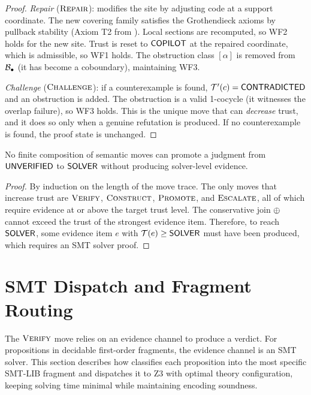 \begin{proof}
\emph{Repair} ($\textsc{Repair}$): modifies the site by adjusting code at
a support coordinate.  The new covering family satisfies the
Grothendieck axioms by pullback stability (Axiom T2 from
).  Local sections are recomputed, so WF2 holds
for the new site.  Trust is reset to $\mathsf{COPILOT}$ at the repaired
coordinate, which is admissible, so WF1 holds.  The obstruction
class $[\alpha]$ is removed from $\mathcal{B}_\bullet$ (it has become
a coboundary), maintaining WF3.

\emph{Challenge} ($\textsc{Challenge}$): if a counterexample is found,
$\mathcal{T}'(c) = \mathsf{CONTRADICTED}$ and an obstruction is added.  The
obstruction is a valid 1-cocycle (it witnesses the overlap
failure), so WF3 holds.  This is the unique move that can
\emph{decrease} trust, and it does so only when a genuine
refutation is produced.  If no counterexample is found, the proof
state is unchanged.
\end{proof}

\begin{corollary}\label{cor:no-laundering}
No finite composition of semantic moves can promote a judgment from
$\mathsf{UNVERIFIED}$ to $\mathsf{SOLVER}$ without producing solver-level evidence.
\end{corollary}

\begin{proof}
By induction on the length of the move trace.  The only moves that
increase trust are $\textsc{Verify}$, $\textsc{Construct}$, $\textsc{Promote}$, and
$\textsc{Escalate}$, all of which require evidence at or above the target
trust level.  The conservative join $\oplus$ cannot exceed the trust
of the strongest evidence item.  Therefore, to reach $\mathsf{SOLVER}$,
some evidence item $e$ with $\mathcal{T}(e) \geq \mathsf{SOLVER}$ must have
been produced, which requires an SMT solver proof.
\end{proof}


\section{SMT Dispatch and Fragment Routing}\label{sec:dispatch}

The $\textsc{Verify}$ move relies on an evidence channel to produce a verdict.
For propositions in decidable first-order fragments, the evidence
channel is an SMT solver.  This section describes how \JuGeo{}
classifies each proposition into the most specific SMT-LIB fragment and
dispatches it to Z3 with optimal theory configuration, keeping solving
time minimal while maintaining encoding soundness.

